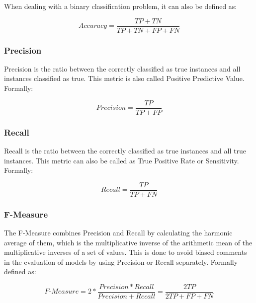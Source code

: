 When dealing with a binary classification problem, it can also be defined as:

\begin{equation} Accuracy = \frac{TP+TN}{TP+TN+FP+FN} \end{equation}

\subsubsection{Precision}

Precision is the ratio between the correctly classified as true instances and all instances classified as true. This metric is also called Positive Predictive Value. Formally:

\begin{equation} Precision = \frac{TP}{TP+FP} \end{equation}

\subsubsection{Recall}

Recall is the ratio between the correctly classified as true instances and all true instances. This metric can also be called as True Positive Rate or Sensitivity. Formally:

\begin{equation} Recall = \frac{TP}{TP+FN} \end{equation}




\subsubsection{F-Measure}

The F-Measure combines Precision and Recall by calculating the harmonic average of them, which is the multiplicative inverse of the arithmetic mean of the multiplicative inverses of a set of values. This is done to avoid biased comments in the evaluation of models by using Precision or Recall separately. Formally defined as: 

\begin{equation} F\mbox{-}Measure = 2*\frac{Precision*Recall}{Precision+Recall} = \frac{2TP}{2TP+FP+FN} \end{equation}

